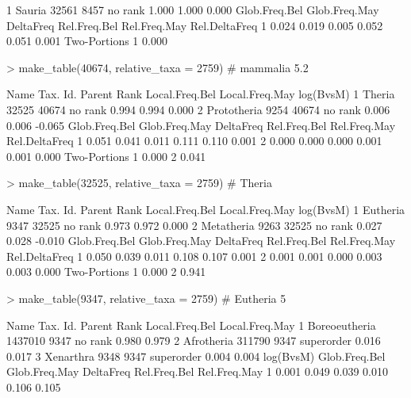 \documentclass{article}
\begin{document}
\begin{Schunk}
\begin{Soutput}
1 Sauria    32561   8457 no rank          1.000          1.000     0.000
  Glob.Freq.Bel Glob.Freq.May DeltaFreq Rel.Freq.Bel Rel.Freq.May Rel.DeltaFreq
1         0.024         0.019     0.005        0.052        0.051         0.001
  Two-Portions
1        0.000
\end{Soutput}
\begin{Sinput}
> make_table(40674, relative_taxa = 2759) # mammalia 5.2% B and 4.1% M
\end{Sinput}
\begin{Soutput}
         Name Tax. Id. Parent    Rank Local.Freq.Bel Local.Freq.May log(BvsM)
1      Theria    32525  40674 no rank          0.994          0.994     0.000
2 Prototheria     9254  40674 no rank          0.006          0.006    -0.065
  Glob.Freq.Bel Glob.Freq.May DeltaFreq Rel.Freq.Bel Rel.Freq.May Rel.DeltaFreq
1         0.051         0.041     0.011        0.111        0.110         0.001
2         0.000         0.000     0.000        0.001        0.001         0.000
  Two-Portions
1        0.000
2        0.041
\end{Soutput}
\begin{Sinput}
> make_table(32525, relative_taxa = 2759) # Theria   
\end{Sinput}
\begin{Soutput}
        Name Tax. Id. Parent    Rank Local.Freq.Bel Local.Freq.May log(BvsM)
1   Eutheria     9347  32525 no rank          0.973          0.972     0.000
2 Metatheria     9263  32525 no rank          0.027          0.028    -0.010
  Glob.Freq.Bel Glob.Freq.May DeltaFreq Rel.Freq.Bel Rel.Freq.May Rel.DeltaFreq
1         0.050         0.039     0.011        0.108        0.107         0.001
2         0.001         0.001     0.000        0.003        0.003         0.000
  Two-Portions
1        0.000
2        0.941
\end{Soutput}
\begin{Sinput}
> make_table(9347, relative_taxa = 2759)  # Eutheria 5% B and 3.9% M (We did detect about 0.1% B and B reads mapped to marsupials)
\end{Sinput}
\begin{Soutput}
           Name Tax. Id. Parent       Rank Local.Freq.Bel Local.Freq.May
1 Boreoeutheria  1437010   9347    no rank          0.980          0.979
2    Afrotheria   311790   9347 superorder          0.016          0.017
3     Xenarthra     9348   9347 superorder          0.004          0.004
  log(BvsM) Glob.Freq.Bel Glob.Freq.May DeltaFreq Rel.Freq.Bel Rel.Freq.May
1     0.001         0.049         0.039     0.010        0.106        0.105

\end{Soutput}
\end{Schunk}
\end{document}
